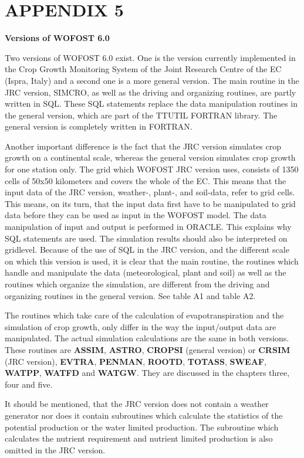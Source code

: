 \section{  APPENDIX 5  }

\bigskip
{\bf {\large Versions of WO\-FOST 6.0}}

Two versions of WOFOST 6.0 exist. One is the version currently implemented in the
Crop Growth Monitoring System of the Joint Research Centre of the EC (Ispra, Italy) and
a second one is a more general version. The main routine in the JRC version, SIMCRO,
as well as the driving and organizing routines, are partly written in SQL. These SQL
statements replace the data manipula\-tion routines in the general version, which are part of
the TTUTIL FORTRAN library. The general version is completely written in FOR\-TRAN.

Another important difference is the fact that the JRC version simulates crop growth on a
continental scale, whereas the general version simulates crop growth for one station only.
The grid which WOFOST JRC version uses, consists of 1350 cells of 50x50 kilometers
and covers the whole of the EC. This means that the input data of the JRC ver\-{\nobreak}sion,
weather-, plant-, and soil-data, refer to grid cells. This means, on its turn, that the input
data first have to be manipulated to grid data before they can be used as input in the
WOFOST model. The data manipulation of input and output is performed in ORACLE.
This explains why SQL statements are used. The simulation results should also be
interpreted on gridlevel. Bec\-ause of the use of SQL in the JRC version, and the different
scale on which this version is used, it is clear that the main routine, the routines which
handle and manipulate the data (meteorological, plant and soil) as well as the routines
which organize the simulation, are different from the driving and organizing routines in
the general version. See table A1 and table A2. 

The routines which take care of the calculation of evapotranspiration and the simulation of
crop growth, only differ in the way the input/output data are manipulat\-ed. The actual
simulation calculations are the same in both versions. These routines are {\bf ASSIM},
{\bf ASTRO}, {\bf CROPSI} (general version) or {\bf CRSIM} (JRC version), {\bf EVTRA}, {\bf PENMAN},
{\bf ROOTD}, {\bf TOTASS}, {\bf SWEAF}, {\bf WATPP}, {\bf WATFD} and {\bf WATGW}. They are discussed in
the chapters three, four and five. 

It should be mentioned, that the JRC version does not contain a weather generator nor
does it contain subrou\-tines which calculate the statistics of the potential produc\-tion or the
water limited production. The subroutine which calculates the nutrient requirement and
nutrient limited production is also omitted in the JRC version.

